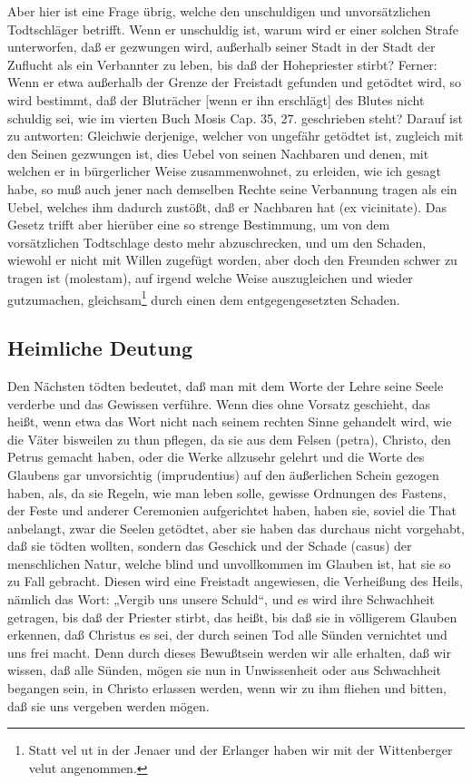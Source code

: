 Aber hier ist eine Frage übrig, welche den unschuldigen und unvorsätzlichen Todtschläger betrifft. Wenn er unschuldig ist, warum wird er einer solchen Strafe unterworfen, daß er gezwungen wird, außerhalb seiner Stadt in der Stadt der Zuflucht als ein Verbannter zu leben, bis daß der Hohepriester stirbt? Ferner: Wenn er etwa außerhalb der Grenze der Freistadt gefunden und getödtet wird, so wird bestimmt, daß der Bluträcher [wenn er ihn erschlägt] des Blutes nicht schuldig sei, wie im vierten Buch Mosis Cap. 35, 27. geschrieben steht? Darauf ist zu antworten: Gleichwie derjenige, welcher von ungefähr getödtet ist, zugleich mit den Seinen gezwungen ist, dies Uebel von seinen Nachbaren und denen, mit welchen er in bürgerlicher Weise zusammenwohnet, zu erleiden, wie ich gesagt habe, so muß auch jener nach demselben Rechte seine Verbannung tragen als ein Uebel, welches ihm dadurch zustößt, daß er Nachbaren hat (ex vicinitate). Das Gesetz trifft aber hierüber eine so strenge Bestimmung, um von dem vorsätzlichen Todtschlage desto mehr abzuschrecken, und um den Schaden, wiewohl er nicht mit Willen zugefügt worden, aber doch den Freunden schwer zu tragen ist (molestam), auf irgend welche Weise auszugleichen und wieder gutzumachen, gleichsam\footnote{Statt vel ut in der Jenaer und der Erlanger haben wir mit der Wittenberger velut angenommen.} durch einen dem entgegengesetzten Schaden.

\subsection{Heimliche Deutung}

Den Nächsten tödten bedeutet, daß man mit dem Worte der Lehre seine Seele verderbe und das Gewissen verführe. Wenn dies ohne Vorsatz geschieht, das heißt, wenn etwa das Wort nicht nach seinem rechten Sinne gehandelt wird, wie die Väter bisweilen zu thun pflegen, da sie aus dem Felsen (petra), Christo, den Petrus gemacht haben, oder die Werke allzusehr gelehrt und die Worte des Glaubens gar unvorsichtig (imprudentius) auf den äußerlichen Schein gezogen haben, als, da sie Regeln, wie man leben solle, gewisse Ordnungen des Fastens, der Feste und anderer Ceremonien aufgerichtet haben, haben sie, soviel die That anbelangt, zwar die Seelen getödtet, aber sie haben das durchaus nicht vorgehabt, daß sie tödten wollten, sondern das Geschick und der Schade (casus) der menschlichen Natur, welche blind und unvollkommen im Glauben ist, hat sie so zu Fall gebracht. Diesen wird eine Freistadt angewiesen, die Verheißung des Heils, nämlich das Wort: „Vergib
uns unsere Schuld“, und es wird ihre Schwachheit getragen, bis daß der Priester stirbt, das heißt, bis daß sie in völligerem Glauben erkennen, daß Christus es sei, der durch seinen Tod alle Sünden vernichtet und uns frei macht. Denn durch dieses Bewußtsein werden wir alle erhalten, daß wir wissen, daß alle Sünden, mögen sie nun in Unwissenheit oder aus Schwachheit begangen sein, in Christo erlassen werden, wenn wir zu ihm fliehen und bitten, daß sie uns vergeben werden mögen.

